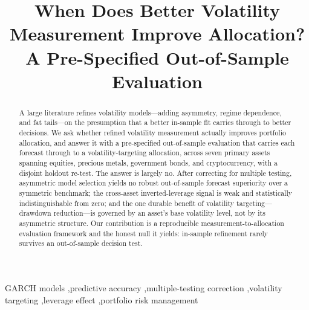 \documentclass[review,12pt]{elsarticle}
\begin{document}
\begin{frontmatter}

\title{When Does Better Volatility Measurement Improve Allocation? A Pre-Specified Out-of-Sample Evaluation}


\begin{abstract}
\noindent
A large literature refines volatility models---adding asymmetry, regime
dependence, and fat tails---on the presumption that a better in-sample fit
carries through to better decisions. We ask whether refined volatility
measurement actually improves portfolio allocation, and answer it with a
pre-specified out-of-sample evaluation that carries each forecast through to
a volatility-targeting allocation, across seven primary assets spanning
equities, precious metals, government bonds, and cryptocurrency, with a
disjoint holdout re-test. The answer is largely no. After correcting for multiple
testing, asymmetric model selection yields no robust out-of-sample forecast
superiority over a symmetric benchmark; the cross-asset inverted-leverage
signal is weak and statistically indistinguishable from zero; and the one
durable benefit of volatility targeting---drawdown reduction---is governed by
an asset's base volatility level, not by its asymmetric structure. Our
contribution is a reproducible measurement-to-allocation evaluation framework
and the honest null it yields: in-sample refinement rarely survives an
out-of-sample decision test.
\end{abstract}

\begin{keyword}
GARCH models \sep predictive accuracy \sep multiple-testing correction \sep volatility targeting \sep leverage effect \sep portfolio risk management
\end{keyword}

\end{frontmatter}




\end{document}
